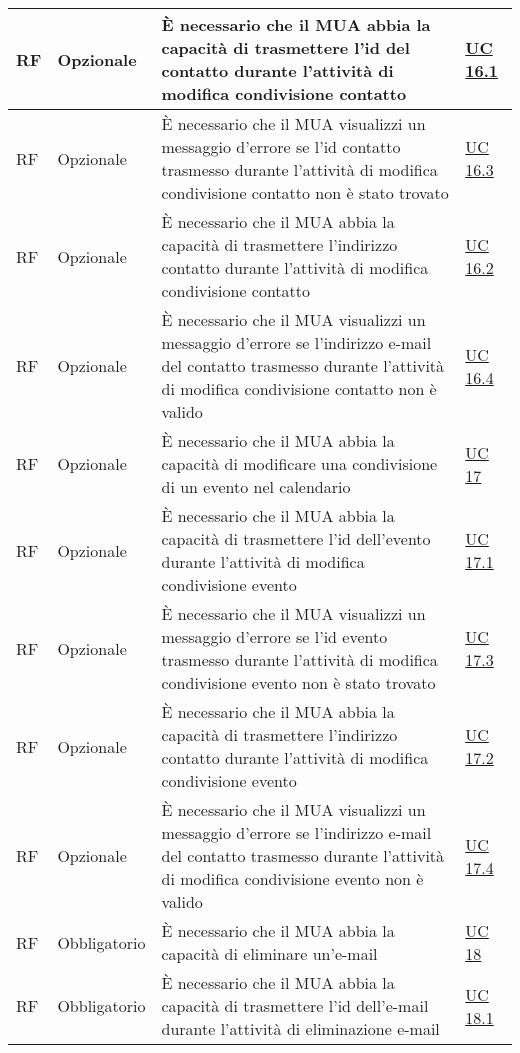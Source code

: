 \begin{longtable}{*{1}{>{\centering\arraybackslash}p{1.5cm}}*{1}{>{\centering\arraybackslash}p{2.5cm}}p{6cm}*{1}{>{\centering\arraybackslash}p{3cm}}}
    RF & Opzionale & È necessario che il MUA abbia la capacità di trasmettere l'id del contatto durante l'attività di modifica condivisione contatto & \hyperref[sec:UC16.1]{UC 16.1}
    \\\hline
    RF & Opzionale & È necessario che il MUA visualizzi un messaggio d'errore se l'id contatto trasmesso durante l'attività di modifica condivisione contatto non è stato trovato & \hyperref[sec:UC16.3]{UC 16.3}
    \\\hline
    RF & Opzionale & È necessario che il MUA abbia la capacità di trasmettere l'indirizzo contatto durante l'attività di modifica condivisione contatto & \hyperref[sec:UC16.2]{UC 16.2}
    \\\hline
    RF & Opzionale & È necessario che il MUA visualizzi un messaggio d'errore se l'indirizzo e-mail del contatto trasmesso durante l'attività di modifica condivisione contatto non è valido & \hyperref[sec:UC16.4]{UC 16.4}
    \\\hline
    RF & Opzionale & È necessario che il MUA abbia la capacità di modificare una condivisione di un evento nel calendario & \hyperref[sec:UC17]{UC 17}
    \\\hline
    RF & Opzionale & È necessario che il MUA abbia la capacità di trasmettere l'id dell'evento durante l'attività di modifica condivisione evento & \hyperref[sec:UC17.1]{UC 17.1}
    \\\hline
    RF & Opzionale & È necessario che il MUA visualizzi un messaggio d'errore se l'id evento trasmesso durante l'attività di modifica condivisione evento non è stato trovato & \hyperref[sec:UC17.3]{UC 17.3}
    \\\hline
    RF & Opzionale & È necessario che il MUA abbia la capacità di trasmettere l'indirizzo contatto durante l'attività di modifica condivisione evento & \hyperref[sec:UC17.2]{UC 17.2}
    \\\hline
    RF & Opzionale & È necessario che il MUA visualizzi un messaggio d'errore se l'indirizzo e-mail del contatto trasmesso durante l'attività di modifica condivisione evento non è valido & \hyperref[sec:UC17.4]{UC 17.4}
    \\\hline
    RF & Obbligatorio & È necessario che il MUA abbia la capacità di eliminare un'e-mail & \hyperref[sec:UC18]{UC 18}
    \\\hline
    RF & Obbligatorio & È necessario che il MUA abbia la capacità di trasmettere l'id dell'e-mail durante l'attività di eliminazione e-mail & \hyperref[sec:UC18.1]{UC 18.1}
    \\\hline

\end{longtable}
